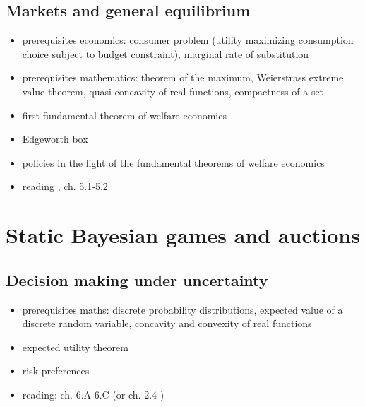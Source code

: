 \documentclass[11pt]{article}
\begin{document}
\subsection{Markets and general equilibrium}
\label{sec:org1f3fd61}
\begin{itemize}
\item prerequisites economics: consumer problem (utility maximizing consumption choice subject to budget constraint), marginal rate of substitution
\item prerequisites mathematics:  theorem of the maximum, Weierstrass extreme value theorem, quasi-concavity of real functions, compactness of a set
\item first fundamental theorem of welfare economics
\item Edgeworth box
\item policies in the light of the fundamental theorems of welfare economics
\item reading \cite{hayek1945use}, \cite{jehle2001advanced} ch. 5.1-5.2
\end{itemize}

\section{Static Bayesian games and auctions}
\label{sec:org8a20e2d}

\subsection{Decision making under uncertainty}
\label{sec:org57cd972}
\begin{itemize}
\item prerequisites maths: discrete probability distributions, expected value of a discrete random variable, concavity and convexity of real functions
\item expected utility theorem
\item risk preferences
\item reading: \cite{mas1995microeconomic} ch. 6.A-6.C (or \cite{jehle2001advanced} ch. 2.4 )
\end{itemize}
\end{document}
